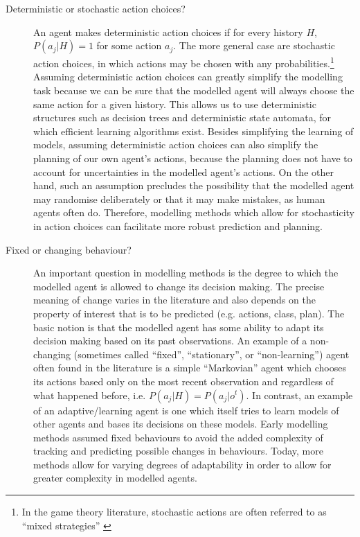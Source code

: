 \documentclass[final,1p,times,authoryear]{elsarticle}
\begin{document}
\begin{description}
	\item[Deterministic or stochastic action choices?]  An agent makes deterministic action choices if for every history $H$, $P(a_j | H) = 1$ for some action $a_j$. The more general case are stochastic action choices, in which actions may be chosen with any probabilities.\footnote{In the game theory literature, stochastic actions are often referred to as ``mixed strategies'' \citep[e.g.][]{m1991gt}} Assuming deterministic action choices can greatly simplify the modelling task because we can be sure that the modelled agent will always choose the same action for a given history. This allows us to use deterministic structures such as decision trees and deterministic state automata, for which efficient learning algorithms exist. Besides simplifying the learning of models, assuming deterministic action choices can also simplify the planning of our own agent's actions, because the planning does not have to account for uncertainties in the modelled agent's actions. On the other hand, such an assumption precludes the possibility that the modelled agent may randomise deliberately or that it may make mistakes, as human agents often do. Therefore, modelling methods which allow for stochasticity in action choices can facilitate more robust prediction and planning.

	\item[Fixed or changing behaviour?]  An important question in modelling methods is the degree to which the modelled agent is allowed to change its decision making. The precise meaning of change varies in the literature and also depends on the property of interest that is to be predicted (e.g. actions, class, plan). The basic notion is that the modelled agent has some ability to adapt its decision making based on its past observations. An example of a non-changing (sometimes called ``fixed'', ``stationary'', or ``non-learning'') agent often found in the literature is a simple ``Markovian'' agent which chooses its actions based only on the most recent observation and regardless of what happened before, i.e. $P(a_j | H) = P(a_j | o^t)$. In contrast, an example of an adaptive/learning agent is one which itself tries to learn models of other agents and bases its decisions on these models. Early modelling methods assumed fixed behaviours to avoid the added complexity of tracking and predicting possible changes in behaviours. Today, more methods allow for varying degrees of adaptability in order to allow for greater complexity in modelled agents.


\end{description}
\end{document}
